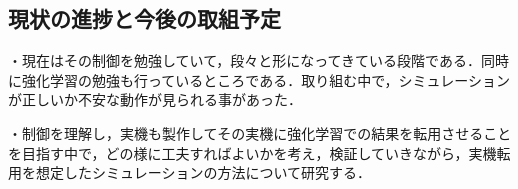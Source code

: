 \documentclass[a4paper,11pt]{jsarticle}
\begin{document}
\subsection{現状の進捗と今後の取組予定}
・現在はその制御を勉強していて，段々と形になってきている段階である．同時に強化学習の勉強も行っているところである．取り組む中で，シミュレーションが正しいか不安な動作が見られる事があった．\par
・制御を理解し，実機も製作してその実機に強化学習での結果を転用させることを目指す中で，どの様に工夫すればよいかを考え，検証していきながら，実機転用を想定したシミュレーションの方法について研究する． \par
\end{document}
